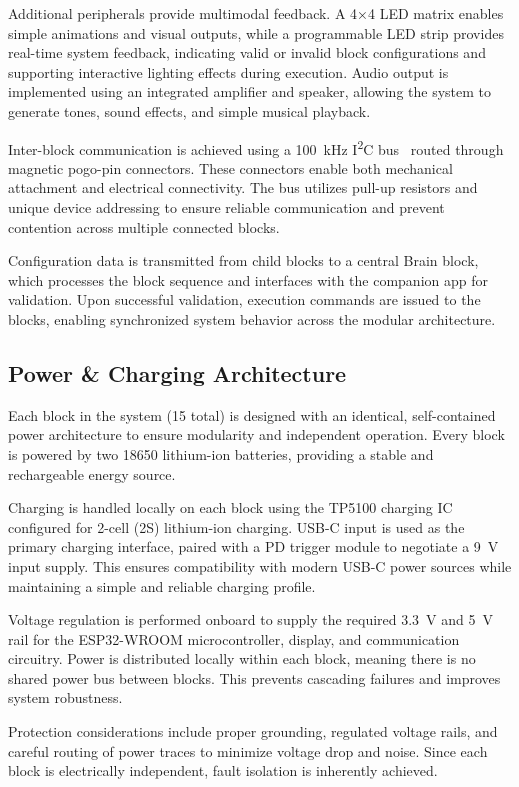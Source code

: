 \documentclass[10pt, conference]{IEEEtran}
\begin{document}
Additional peripherals provide multimodal feedback. A 4×4 LED matrix enables simple animations and visual outputs, while a programmable LED strip provides real-time system feedback, indicating valid or invalid block configurations and supporting interactive lighting effects during execution. Audio output is implemented using an integrated amplifier and speaker, allowing the system to generate tones, sound effects, and simple musical playback.

Inter-block communication is achieved using a 100~kHz I\textsuperscript{2}C bus~\cite{i2c} routed through magnetic pogo-pin connectors. These connectors enable both mechanical attachment and electrical connectivity. The bus utilizes pull-up resistors and unique device addressing to ensure reliable communication and prevent contention across multiple connected blocks.

Configuration data is transmitted from child blocks to a central Brain block, which processes the block sequence and interfaces with the companion app for validation. Upon successful validation, execution commands are issued to the blocks, enabling synchronized system behavior across the modular architecture.

\subsection{Power \& Charging Architecture}
Each block in the system (15 total) is designed with an identical, self-contained power architecture to ensure modularity and independent operation. Every block is powered by two 18650 lithium-ion batteries, providing a stable and rechargeable energy source.

Charging is handled locally on each block using the TP5100 charging IC configured for 2-cell (2S) lithium-ion charging. USB-C input is used as the primary charging interface, paired with a PD trigger module to negotiate a 9~V input supply. This ensures compatibility with modern USB-C power sources while maintaining a simple and reliable charging profile.

Voltage regulation is performed onboard to supply the required 3.3~V and 5~V rail for the ESP32-WROOM microcontroller, display, and communication circuitry. Power is distributed locally within each block, meaning there is no shared power bus between blocks. This prevents cascading failures and improves system robustness.

Protection considerations include proper grounding, regulated voltage rails, and careful routing of power traces to minimize voltage drop and noise. Since each block is electrically independent, fault isolation is inherently achieved.
 
\end{document}
